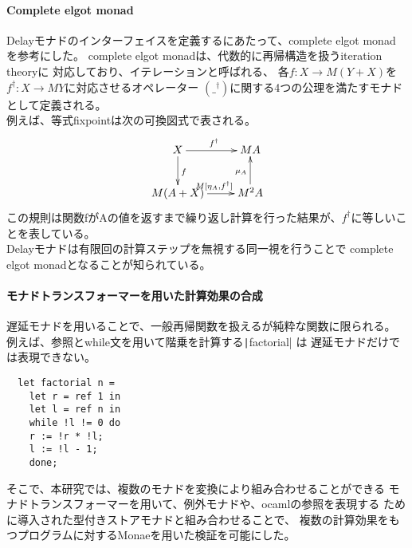 \documentclass[japanese]{jssst_ppl}
\theoremstyle{definition}
\begin{document}
\paragraph{Complete elgot monad}
Delayモナドのインターフェイスを定義するにあたって、complete elgot monad\cite{ADAMEK20101306}
を参考にした。
complete elgot monadは、代数的に再帰構造を扱うiteration theory\cite{1993Bloom}に
対応しており、イテレーションと呼ばれる、
各$f : X \rightarrow M (Y + X)$を$f^{\dagger} : X \rightarrow M Y$に対応させるオペレーター
$(\_^{\dagger})$に関する4つの公理を満たすモナドとして定義される。\\
例えば、等式fixpointは次の可換図式で表される。
\xymatrixcolsep{2.5cm}
\[
  \xymatrix{
  X \ar[r]^{f^{\dagger}} \ar[d]^{f} & M A  \\
  M (A + X) \ar[r]^{M[\eta_A, f^{\dagger}]}  & M^2 A \ar[u]^{\mu_A}
  }
\]
この規則は関数fがAの値を返すまで繰り返し計算を行った結果が、$f^{\dagger}$に等しいことを表している。\\
Delayモナドは有限回の計算ステップを無視する同一視を行うことで
complete elgot monadとなることが知られている\cite{10.1007/978-3-319-67729-3_3}。

\paragraph{モナドトランスフォーマーを用いた計算効果の合成}
遅延モナドを用いることで、一般再帰関数を扱えるが純粋な関数に限られる。
例えば、参照とwhile文を用いて階乗を計算する\texttt|factorial| は
遅延モナドだけでは表現できない。
\begin{verbatim}
  let factorial n =
    let r = ref 1 in
    let l = ref n in
    while !l != 0 do
    r := !r * !l;
    l := !l - 1;
    done;
\end{verbatim}
そこで、本研究では、複数のモナドを変換により組み合わせることができる
モナドトランスフォーマーを用いて、例外モナドや、ocamlの参照を表現する
ために導入された型付きストアモナド\cite{ddd}と組み合わせることで、
複数の計算効果をもつプログラムに対するMonaeを用いた検証を可能にした。
\end{document}
